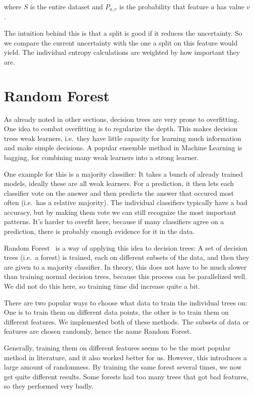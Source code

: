 \documentclass[a4paper]{article}
\begin{document}
\noindent where $S$ is the entire dataset and $P_{a, v}$ is the probability that feature $a$ has value $v$.

The intuition behind this is that a split is good if it reduces the uncertainty. So we compare the current uncertainty with the one a split on this feature would yield. The individual entropy calculations are weighted by how important they are.

\section{Random Forest}

As already noted in other sections, decision trees are very prone to overfitting. One idea to combat overfitting is to regularize the depth. This makes decision trees weak learners, i.e.\ they have little capacity for learning much information and make simple decisions. A popular ensemble method in Machine Learning is bagging, for combining many weak learners into a strong learner.

One example for this is a majority classifier: It takes a bunch of already trained models, ideally these are all weak learners. For a prediction, it then lets each classifier vote on the answer and then predicts the answer that occured most often (i.e.\ has a relative majority). The individual classifiers typically have a bad accuracy, but by making them vote we can still recognize the most important patterns. It's harder to overfit here, because if many classifiers agree on a prediction, there is probably enough evidence for it in the data.

Random Forest~\cite{friedman2001elements} is a way of applying this idea to decision trees: A set of decision trees (i.e.\ a forest) is trained, each on different subsets of the data, and then they are given to a majority classifier. In theory, this does not have to be much slower than training normal decision trees, because this process can be parallelized well. We did not do this here, so training time did increase quite a bit.

There are two popular ways to choose what data to train the individual trees on: One is to train them on different data points, the other is to train them on different features. We implemented both of these methods. The subsets of data or features are chosen randomly, hence the name Random Forest.

Generally, training them on different features seems to be the most popular method in literature, and it also worked better for us. However, this introduces a large amount of randomness. By training the same forest several times, we now get quite different results. Some forests had too many trees that got bad features, so they performed very badly.
\end{document}
